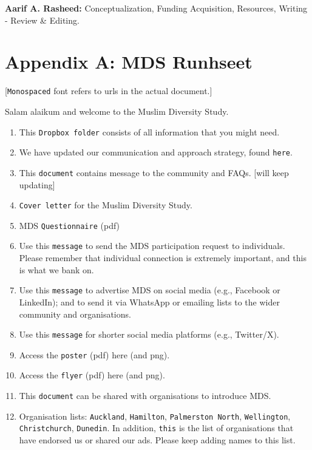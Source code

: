 \documentclass[
]{interact}
\providecommand{\tightlist}{%
  \setlength{\itemsep}{0pt}\setlength{\parskip}{0pt}}\usepackage{longtable,booktabs,array}
\begin{document}
\textbf{Aarif A. Rasheed:} Conceptualization, Funding Acquisition,
Resources, Writing - Review \& Editing.

\newpage{}

\section{Appendix A: MDS Runhseet}\label{appendix-a-mds-runhseet}

{[}\texttt{Monospaced} font refers to urls in the actual document.{]}

\noindent Salam alaikum and welcome to the Muslim Diversity Study.

\begin{enumerate}
\def\labelenumi{\arabic{enumi}.}
\tightlist
\item
  This \texttt{Dropbox\ folder} consists of all information that you
  might need.
\item
  We have updated our communication and approach strategy, found
  \texttt{here}.
\item
  This \texttt{document} contains message to the community and FAQs.
  {[}will keep updating{]}
\item
  \texttt{Cover\ letter} for the Muslim Diversity Study.
\item
  MDS \texttt{Questionnaire} (pdf)
\item
  Use this \texttt{message} to send the MDS participation request to
  individuals. Please remember that individual connection is extremely
  important, and this is what we bank on.
\item
  Use this \texttt{message} to advertise MDS on social media (e.g.,
  Facebook or LinkedIn); and to send it via WhatsApp or emailing lists
  to the wider community and organisations.
\item
  Use this \texttt{message} for shorter social media platforms (e.g.,
  Twitter/X).
\item
  Access the \texttt{poster} (pdf) here (and png).
\item
  Access the \texttt{flyer} (pdf) here (and png).
\item
  This \texttt{document} can be shared with organisations to introduce
  MDS.
\item
  Organisation lists: \texttt{Auckland}, \texttt{Hamilton},
  \texttt{Palmerston\ North}, \texttt{Wellington},
  \texttt{Christchurch}, \texttt{Dunedin}. In addition, \texttt{this} is
  the list of organisations that have endorsed us or shared our ads.
  Please keep adding names to this list.

\end{enumerate}
\end{document}
